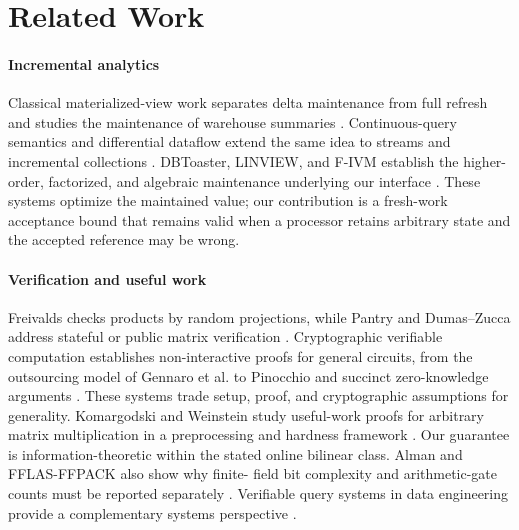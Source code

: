 \section{Related Work}\label{sec:related}
\paragraph{Incremental analytics}
Classical materialized-view work separates delta maintenance from full
refresh and studies the maintenance of warehouse summaries
\cite{gupta1995maintenance,mumick1997maintenance}. Continuous-query
semantics and differential dataflow extend the same idea to streams and
incremental collections \cite{arasu2003cql,mcsherry2013differential}.
DBToaster, LINVIEW, and F-IVM establish the higher-order, factorized, and
algebraic maintenance underlying our interface
\cite{dbtoaster,Linview2014,fivm}. These systems optimize the maintained
value; our contribution is a fresh-work acceptance bound that remains valid
when a processor retains arbitrary state and the accepted reference may be
wrong.

\paragraph{Verification and useful work}
Freivalds checks products by random projections, while Pantry and Dumas--Zucca
address stateful or public matrix verification
\cite{freivalds,Pantry2013,DumasZucca2017}. Cryptographic verifiable
computation establishes non-interactive proofs for general circuits, from
the outsourcing model of Gennaro et al. to Pinocchio and succinct
zero-knowledge arguments \cite{gennaro2010nivr,parno2013pinocchio,
bensasson2013snarks}. These systems trade setup, proof, and cryptographic
assumptions for generality. Komargodski and Weinstein study useful-work
proofs for arbitrary matrix multiplication in a preprocessing and hardness
framework \cite{kwesa}. Our guarantee is information-theoretic within the
stated online bilinear class. Alman and FFLAS-FFPACK also show why finite-
field bit complexity and arithmetic-gate counts must be reported separately
\cite{alman_lookup,dumas2008fflas}. Verifiable query systems in data
engineering provide a complementary systems perspective
\cite{vgq}.

